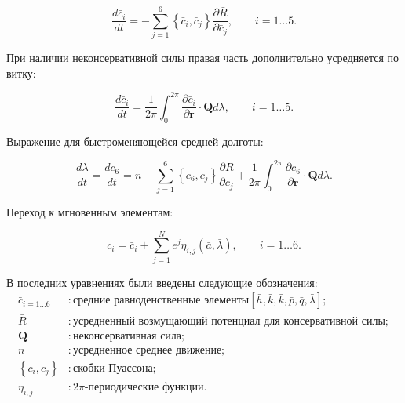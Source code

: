 \begin{equation*}
    \frac{d\bar{c}_i}{dt} = -\sum_{j=1}^{6} \left\{\bar{c}_i, \bar{c}_j \right\} 
                                \frac{\partial \bar{R}}{\partial\bar{c}_j}, \qquad i=1 \dots 5.
\end{equation*}

При наличии неконсервативной силы правая часть дополнительно усредняется по витку:

\begin{equation*}
    \frac{d\bar{c}_i}{dt} = \frac{1}{2 \pi} \int_{0}^{2 \pi} \frac{\partial\bar{c}_i}{\partial\dot{\mathbf{r}}} 
                        \cdot \mathbf{Q} d\lambda, \qquad i=1 \dots 5.
\end{equation*}

Выражение для быстроменяющейся средней долготы:

\begin{equation*}
    \frac{d \bar{\lambda}}{dt} = \frac{d\bar{c}_6}{dt} = 
        \bar{n} -\sum_{j=1}^{6} \left\{\bar{c}_6, \bar{c}_j \right\} 
                                \frac{\partial \bar{R}}{\partial\bar{c}_j}
                +\frac{1}{2 \pi} \int_{0}^{2 \pi} \frac{\partial\bar{c}_6}{\partial\dot{\mathbf{r}}} 
                        \cdot \mathbf{Q} d\lambda.
\end{equation*}

Переход к мгновенным элементам:

\begin{equation*}
    c_i = \bar{c}_i + \sum_{j=1}^{N} e^j \eta_{i, j}\left(\bar{a}, \bar{\lambda}\right), \qquad i = 1 \dots 6.
\end{equation*}

В последних уравнениях были введены следующие обозначения:
\begin{align*}
    \bar{c}_{i=1 \dots 6} &: \text{средние равноденственные элементы} \left[\bar{h}, \bar{k}, \bar{k}, \bar{p}, \bar{q}, \bar{\lambda}\right]; \\
    \bar{R} &: \text{усредненный возмущающий потенциал для консервативной силы}; \\
    \mathbf{Q} &: \text{неконсервативная сила}; \\
    \bar{n} &: \text{усредненное среднее движение}; \\
    \left\{\bar{c}_i, \bar{c}_j \right\} &: \text{скобки Пуассона}; \\
    \eta_{i, j} &: 2\pi \text{-периодические функции}.
\end{align*}

